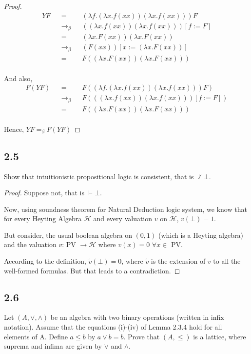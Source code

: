 \documentclass[12pt]{article}
\begin{document}
\begin{proof}
\begin{align*}
    YF &&=&& (\lambda f.(\lambda x.f (xx))(\lambda x.f (xx)))F \\
    &&\rightarrow_\beta&& ((\lambda x.f (xx))(\lambda x.f (xx)))[f:=F] \\
    &&=&& (\lambda x.F (xx))(\lambda x.F (xx)) \\
    &&\rightarrow_\beta&& (F (xx))[x:=(\lambda x.F (xx))] \\
    &&=&& F ((\lambda x.F (xx))(\lambda x.F (xx))) \\
\end{align*}

And also,
\begin{align*}
    F(YF) &&=&& F\left((\lambda f.(\lambda x.f (xx))(\lambda x.f (xx)))F\right) \\
    &&\rightarrow_\beta&& F\left(((\lambda x.f (xx))(\lambda x.f (xx)))[f:=F]\right) \\
    &&=&& F\left((\lambda x.F (xx))(\lambda x.F (xx))\right) \\
\end{align*}

Hence, $YF =_\beta F(YF)$
\end{proof}


\subsection*{2.5}
Show that intuitionistic propositional logic is consistent, that is $\not \vdash \bot$. \\

\begin{proof}
Suppose not, that is $\vdash \bot$.

Now, using soundness theorem for Natural Deduction logic system, we know that for every Heyting Algebra $\mathcal{H}$ and every valuation $v$ on $\mathcal{H}$, $v(\bot) = 1$.

But consider, the usual boolean algebra on $(0,1)$ (which is a Heyting algebra) and the valuation $v$: PV $\rightarrow \mathcal{H}$ where $v(x) = 0$ $\forall x \in$ PV.

According to the definition, $\widetilde{v}(\bot) = 0$, where $\widetilde{v}$ is the extension of $v$ to all the well-formed formulas. But that leads to a contradiction.
\end{proof}


\subsection*{2.6}
Let $(A, \vee, \wedge)$ be an algebra with two binary operations (written in infix notation). Assume that the equations (i)-(iv) of Lemma 2.3.4 hold for all elements of A. Define $a \leq b$ by $a \vee b = b$. Prove that $(A, \leq)$ is a lattice, where suprema and infima are given by $\vee$ and $\wedge$. \\ 
\end{document}
